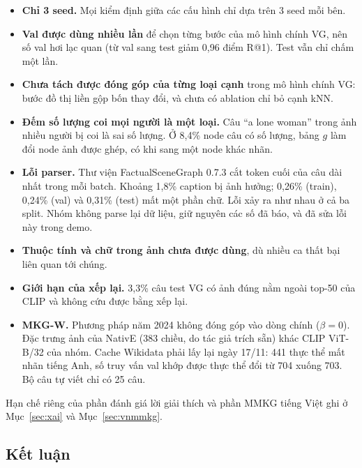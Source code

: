 \begin{itemize}
\item \textbf{Chỉ 3 seed.} Mọi kiểm định giữa các cấu hình chỉ dựa trên 3 seed mỗi bên.
\item \textbf{Val được dùng nhiều lần} để chọn từng bước của mô hình chính VG, nên số val hơi lạc quan (từ val sang test giảm
0,96 điểm R@1). Test vẫn chỉ chấm một lần.
\item \textbf{Chưa tách được đóng góp của từng loại cạnh} trong mô hình chính VG: bước đồ thị liền gộp bốn thay đổi, và chưa có
ablation chỉ bỏ cạnh kNN.
\item \textbf{Đếm số lượng coi mọi người là một loại.} Câu ``a lone woman'' trong ảnh nhiều người bị coi là sai số lượng.
Ở 8,4\% node câu có số lượng, bảng $g$ làm đổi node ảnh được ghép, có khi sang một node khác nhãn.
\item \textbf{Lỗi parser.} Thư viện FactualSceneGraph 0.7.3 cắt token cuối của câu dài nhất trong mỗi batch. Khoảng 1,8\%
caption bị ảnh hưởng; 0,26\% (train), 0,24\% (val) và 0,31\% (test) mất một phần chữ. Lỗi xảy ra như nhau ở cả ba split.
Nhóm không parse lại dữ liệu, giữ nguyên các số đã báo, và đã sửa lỗi này trong demo.
\item \textbf{Thuộc tính và chữ trong ảnh chưa được dùng}, dù nhiều ca thất bại liên quan tới chúng.
\item \textbf{Giới hạn của xếp lại.} 3,3\% câu test VG có ảnh đúng nằm ngoài top-50 của CLIP và không cứu được bằng xếp lại.
\item \textbf{MKG-W.} Phương pháp năm 2024 không đóng góp vào dòng chính ($\beta = 0$). Đặc trưng ảnh của NativE (383 chiều,
do tác giả trích sẵn) khác CLIP ViT-B/32 của nhóm. Cache Wikidata phải lấy lại ngày 17/11: 441 thực thể mất nhãn tiếng Anh,
số truy vấn val khớp được thực thể đổi từ 704 xuống 703. Bộ câu tự viết chỉ có 25 câu.
\end{itemize}
Hạn chế riêng của phần đánh giá lời giải thích và phần MMKG tiếng Việt ghi ở Mục~\ref{sec:xai} và Mục~\ref{sec:vnmmkg}.

\subsection{Kết luận}

